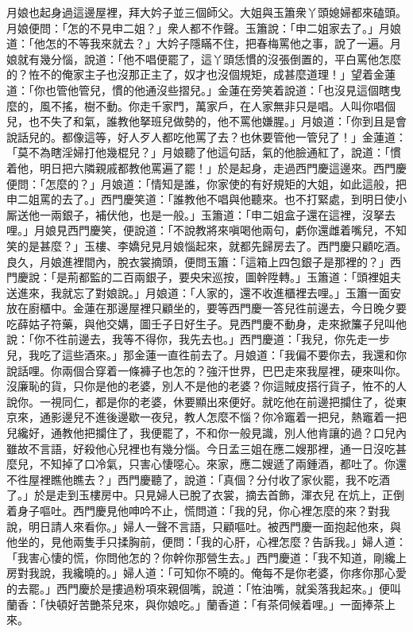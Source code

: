 月娘也起身過這邊屋裡，拜大妗子並三個師父。大姐與玉簫衆丫頭媳婦都來磕頭。月娘便問：「怎的不見申二姐？」衆人都不作聲。玉簫說：「申二姐家去了。」月娘道：「他怎的不等我來就去？」大妗子隱瞞不住，把春梅罵他之事，說了一遍。月娘就有幾分惱，{}說道：「他不唱便罷了，這丫頭恁慣的沒張倒置的，平白罵他怎麼的？恠不的俺家主子也沒那正主了，奴才也沒個規矩，成甚麼道理！」{}望着金蓮道：「你也管他管兒，慣的他通沒些摺兒。」金蓮在旁笑着說道：「也沒見這個瞎曳麼的，風不搖，樹不動。你走千家門，萬家戶，在人家無非只是唱。人叫你唱個兒，也不失了和氣，誰教他拏班兒做勢的，他不罵他嫌腥。」月娘道：「你到且是會說話兒的。都像這等，好人歹人都吃他罵了去？也休要管他一管兒了！」金蓮道：「莫不為瞎淫婦打他幾棍兒？」{}月娘聽了他這句話，氣的他臉通紅了，說道：「慣着他，明日把六隣親戚都教他罵遍了罷！」於是起身，走過西門慶這邊來。西門慶便問：「怎麼的？」月娘道：「情知是誰，你家使的有好規矩的大姐，如此這般，把申二姐罵的去了。」西門慶笑道：「誰教他不唱與他聽來。{}也不打緊處，到明日使小厮送他一兩銀子，補伏他，也是一般。」玉簫道：「申二姐盒子還在這裡，沒拏去哩。」月娘見西門慶笑，便說道：「不說教將來嗔喝他兩句，{}虧你還雌着嘴兒，不知笑的是甚麼？」玉樓、李嬌兒見月娘惱起來，就都先歸房去了。西門慶只顧吃酒。良久，月娘進裡間內，脫衣裳摘頭，便問玉簫：「這箱上四包銀子是那裡的？」西門慶說：「是荊都監的二百兩銀子，要央宋巡按，圖幹陞轉。」玉簫道：「頭裡姐夫送進來，我就忘了對娘說。」月娘道：「人家的，還不收進櫃裡去哩。」玉簫一面安放在廚櫃中。金蓮在那邊屋裡只顧坐的，要等西門慶一答兒徃前邊去，今日晚夕要吃薛姑子符藥，與他交媾，圖壬子日好生子。見西門慶不動身，走來掀簾子兒叫他說：「你不徃前邊去，我等不得你，我先去也。」{}西門慶道：「我兒，你先走一步兒，我吃了這些酒來。」那金蓮一直徃前去了。月娘道：「我偏不要你去，{}我還和你說話哩。你兩個合穿着一條褲子也怎的？強汗世界，巴巴走來我屋裡，硬來叫你。沒廉恥的貨，只你是他的老婆，別人不是他的老婆？你這賊皮搭行貨子，恠不的人說你。一視同仁，都是你的老婆，休要顯出來便好。{}就吃他在前邊把攔住了，從東京來，通影邊兒不進後邊歇一夜兒，教人怎麼不惱？你冷竈着一把兒，熱竈着一把兒纔好，通教他把攔住了，我便罷了，不和你一般見識，別人他肯讓的過？{}口兒內雖故不言語，好殺他心兒裡也有幾分惱。{}今日孟三姐在應二嫂那裡，通一日沒吃甚麼兒，不知掉了口冷氣，只害心悽噁心。來家，應二嫂遞了兩鍾酒，都吐了。你還不徃屋裡瞧他瞧去？」{}西門慶聽了，說道：「真個？分付收了家伙罷，我不吃酒了。」於是走到玉樓房中。只見婦人已脫了衣裳，摘去首飾，渾衣兒𢱉在炕上，正倒着身子嘔吐。西門慶見他呻吟不止，慌問道：「我的兒，你心裡怎麼的來？對我說，明日請人來看你。」{}婦人一聲不言語，只顧嘔吐。被西門慶一面抱起他來，與他坐的，見他兩隻手只揉胸前，便問：「我的心肝，心裡怎麼？告訴我。」婦人道：「我害心悽的慌，你問他怎的？你幹你那營生去。」西門慶道：「我不知道，剛纔上房對我說，我纔曉的。」婦人道：「可知你不曉的。{}俺每不是你老婆，你疼你那心愛的去罷。」西門慶於是摟過粉項來親個嘴，說道：「恠油嘴，就奚落我起來。」便叫蘭香：「快頓好苦艷茶兒來，與你娘吃。」蘭香道：「有茶伺候着哩。」一面捧茶上來。

